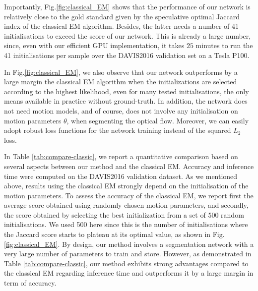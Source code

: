 \documentclass[10pt,twocolumn,letterpaper]{article}
\begin{document}
Importantly, Fig.\ref{fig:classical_EM} shows that the performance of our network is relatively close to the gold standard given by the speculative optimal Jaccard index of the classical EM algorithm. Besides, the latter needs a number of 41 initialisations to exceed the score of our network. This is already a large number, since, even with our efficient GPU implementation, it takes $25$ minutes to run the 41 initialisations per sample over the DAVIS2016 validation set on a Tesla P100.


In Fig.\ref{fig:classical_EM}, we also observe that our network outperforms by a large margin the classical EM algorithm when the initializations are selected according to the highest likelihood, even for many tested initialisations, the only means available in practice without ground-truth. In addition, the network does not need motion models, and of course, does not involve any initialisation on motion parameters $\theta$, when segmenting the optical flow.
Moreover, we can easily adopt robust loss functions for the network training instead of the squared $L_2$ loss.

In Table \ref{tab:compare-classic}, we report a quantitative comparison based on several aspects between our method and the classical EM. Accuracy and inference time were computed on the DAVIS2016 validation dataset. As we mentioned above, results using the classical EM strongly depend on the initialisation of the motion parameters. To assess the accuracy of the classical EM, we report first the average score obtained using randomly chosen motion parameters, and secondly, the score obtained by selecting the best initialization from a set of 500 random initialisations. We used 500 here since this is the number of initialisations where the Jaccard score starts to plateau at its optimal value, as shown in Fig.\ref{fig:classical_EM}. By design, our method involves a segmentation network with a very large number of parameters to train and store. However, as demonstrated in Table \ref{tab:compare-classic}, our method exhibits strong advantages compared to the classical EM regarding inference time and outperforms it by a large margin in term of accuracy.
\end{document}
